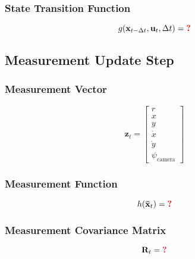 \documentclass{article}
\newcommand{\todo}[1]{\textcolor{red}{\textbf{#1}}}
\begin{document}
\subsubsection{State Transition Function}

\begin{equation}
  g(\mathbf{x}_{t-\Delta t}, \mathbf{u}_t, \Delta t) = \todo{?}
\end{equation}

\subsection{Measurement Update Step}

\subsubsection{Measurement Vector}

\begin{equation}
\mathbf{z}_t = \begin{bmatrix}
r \\
x \\
y \\
\dot x \\
\dot y \\
\psi_{\text{camera}}
\end{bmatrix}
\end{equation}

\subsubsection{Measurement Function}

\begin{equation}
  h(\mathbf{\bar x}_t) = \todo{?}
\end{equation}

\subsubsection{Measurement Covariance Matrix}

\begin{equation}
  \mathbf{R}_t = \todo{?}
\end{equation}
\end{document}
